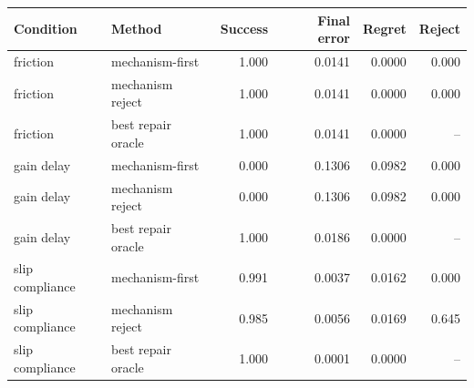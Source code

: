 \begin{tabular}{llrrrr}
\toprule
Condition & Method & Success & Final error & Regret & Reject \\
\midrule
friction & mechanism-first & 1.000 & 0.0141 & 0.0000 & 0.000 \\
friction & mechanism reject & 1.000 & 0.0141 & 0.0000 & 0.000 \\
friction & best repair oracle & 1.000 & 0.0141 & 0.0000 & -- \\
gain delay & mechanism-first & 0.000 & 0.1306 & 0.0982 & 0.000 \\
gain delay & mechanism reject & 0.000 & 0.1306 & 0.0982 & 0.000 \\
gain delay & best repair oracle & 1.000 & 0.0186 & 0.0000 & -- \\
slip compliance & mechanism-first & 0.991 & 0.0037 & 0.0162 & 0.000 \\
slip compliance & mechanism reject & 0.985 & 0.0056 & 0.0169 & 0.645 \\
slip compliance & best repair oracle & 1.000 & 0.0001 & 0.0000 & -- \\
\bottomrule
\end{tabular}
